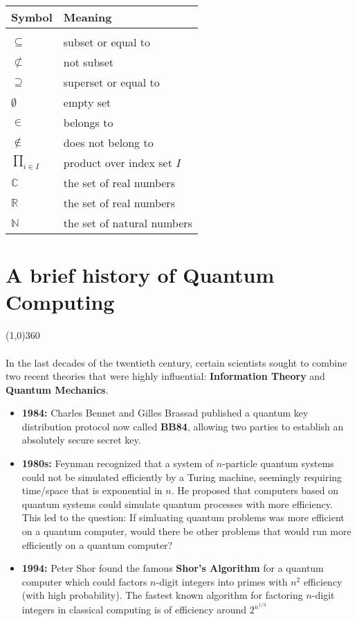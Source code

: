 \documentclass[12pt,twoside]{report}
\begin{document}
\begin{tabular}{p{2cm}p{5cm}}
\textbf{Symbol} & \textbf{Meaning}\\
\hline
& \\
$\subseteq$ & subset or equal to \\%
$\not\subset$ & not subset\\%
$\supseteq$ & superset or equal to \\
$\emptyset$ & empty set\\%
$\in$ & belongs to\\%
$\not \in $ & does not belong to \\
$\displaystyle\prod_{i \in I}$ & product over index set $I$ \\
$\mathbb{C}$ & the set of real numbers\\%
$\mathbb{R}$ & the set of real numbers\\%
$\mathbb{N}$ & the set of natural numbers\\%
\end{tabular}

\tableofcontents
\newpage
{}

\chapter{A brief history of Quantum Computing}
\line(1,0){360} \\ \\
In the last decades of the twentieth century, certain scientists sought to combine two recent theories that were highly influential: \textbf{Information Theory} and \textbf{Quantum Mechanics}.

\begin{itemize}
\item \textbf{1984:} Charles Bennet and Gilles Brassad published a quantum key distribution protocol now called \textbf{BB84}, allowing two parties to establish an absolutely secure secret key.
\item \textbf{1980s:} Feynman recognized that a system of
    $n$-particle quantum systems could not be simulated efficiently by a Turing machine, seemingly requiring time/space that is exponential in $n$. He proposed that computers based on quantum systems could simulate quantum processes with more efficiency. This led to the question: If simluating quantum problems was more efficient on a quantum computer, would there be other problems that would run more efficiently on a quantum computer?
\item \textbf{1994:} Peter Shor found the famous \textbf{Shor's Algorithm} for a quantum computer which could factors $n$-digit integers into primes with $n^2$ efficiency (with high probability). The fastest known algorithm for factoring $n$-digit integers in classical computing is of efficiency around $2^{n^{1/3}}$
\end{itemize}
\end{document}
